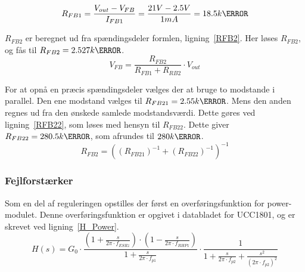 \begin{equation} \label{RFB1}
R_{FB1} = \frac{V_{out}-V_{FB}}{I_{FB1}} = \frac{21V-2.5V}{1mA} = 18.5k\ohm
\end{equation}

\noindent $R_{FB2}$ er beregnet ud fra spændingsdeler formlen, ligning~\ref{RFB2}. Her løses $R_{FB2}$, og fås til $R_{FB2}=2.527k \ohm$.  
\begin{equation} \label{RFB2}
V_{FB} = \frac{R_{FB2}}{R_{FB1} + R_{RB2}} \cdot V_{out}
\end{equation}

For at opnå en præcis spændingsdeler vælges der at bruge to modstande i parallel. Den ene modstand vælges til $R_{FB21}=2.55k\ohm$. Mens den anden regnes ud fra den ønskede samlede modstandsværdi. Dette gøres ved ligning~\ref{RFB22}, som løses med hensyn til $R_{FB22}$. Dette giver $R_{FB22}=280.5k\ohm$, som afrundes til $280k\ohm$.
\begin{equation} \label{RFB22}
R_{FB2} = ((R_{FB21})^{-1} + (R_{FB22})^{-1})^{-1}
\end{equation}

\subsubsection{Fejlforstærker}
Som en del af reguleringen opstilles der først en overføringsfunktion for power-modulet. Denne overføringsfunktion er opgivet i databladet for UCC1801, og er skrevet ved ligning~\ref{H_Power}.
\begin{equation} \label{H_Power}
H(s) = G_0 \cdot \frac{(1+\frac{s}{2\pi \cdot f_{ESRz}}) \cdot (1-\frac{s}{2\pi \cdot f_{RHPz}})}{1+\frac{s}{2\pi \cdot f_{p1}}} \cdot \frac{1}{1 + \frac{s}{2\pi \cdot f_{p2}} + \frac{s^2}{(2\pi \cdot f_{p2})^2}}
\end{equation}

